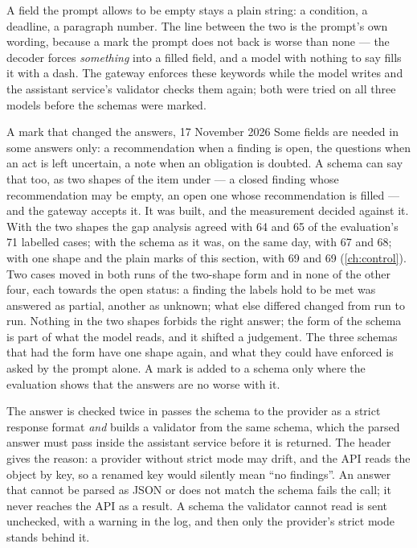 A field the prompt allows to be empty stays a plain string: a condition, a deadline, a
paragraph number. The line between the two is the prompt's own wording, because a mark the
prompt does not back is worse than none --- the decoder forces \emph{something} into a
filled field, and a model with nothing to say fills it with a dash. The gateway enforces
these keywords while the model writes and the assistant service's validator checks them
again; both were tried on all three models before the schemas were marked.

\begin{lessonbox}{A mark that changed the answers, 17 November 2026}
Some fields are needed in some answers only: a recommendation when a finding is open, the
questions when an act is left uncertain, a note when an obligation is doubted. A schema can
say that too, as two shapes of the item under  --- a closed finding whose
recommendation may be empty, an open one whose recommendation is filled --- and the gateway
accepts it. It was built, and the measurement decided against it. With the two shapes the gap
analysis agreed with 64 and 65 of the evaluation's 71 labelled cases; with the schema as it
was, on the same day, with 67 and 68; with one shape and the plain marks of this section,
with 69 and 69 (\cref{ch:control}). Two cases moved in both runs of the two-shape form and
in none of the other four, each towards the open status: a finding the labels hold to be met
was answered as partial, another as unknown; what else differed changed from run to run. Nothing in the two shapes forbids the right answer; the form of
the schema is part of what the model reads, and it shifted a judgement. The three schemas
that had the form have one shape again, and what they could have enforced is asked by the
prompt alone. A mark is added to a schema only where the evaluation shows that the answers
are no worse with it.
\end{lessonbox}

\begin{codebox}{The answer is checked twice}
 in  passes the schema to the provider as a strict
response format \emph{and} builds a validator from the same schema, which the parsed answer
must pass inside the assistant service before it is returned. The header gives the reason: a
provider without strict mode may drift, and the API reads the object by key, so a renamed key
would silently mean \enquote{no findings}. An answer that cannot be parsed as JSON or does not
match the schema fails the call; it never reaches the API as a result. A schema the validator
cannot read is sent unchecked, with a warning in the log, and then only the provider's strict
mode stands behind it.
\end{codebox}

